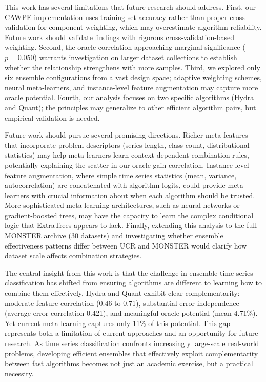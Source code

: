 \documentclass[pdflatex,sn-basic]{sn-jnl}           %
\theoremstyle{thmstyleone}%
\theoremstyle{thmstyletwo}%
\theoremstyle{thmstylethree}%
\begin{document}
This work has several limitations that future research should address. First, our CAWPE implementation uses training set accuracy rather than proper cross-validation for component weighting, which may overestimate algorithm reliability. Future work should validate findings with rigorous cross-validation-based weighting. Second, the oracle correlation approaching marginal significance ($p=0.050$) warrants investigation on larger dataset collections to establish whether the relationship strengthens with more samples. Third, we explored only six ensemble configurations from a vast design space; adaptive weighting schemes, neural meta-learners, and instance-level feature augmentation may capture more oracle potential. Fourth, our analysis focuses on two specific algorithms (Hydra and Quant); the principles may generalize to other efficient algorithm pairs, but empirical validation is needed.

Future work should pursue several promising directions. Richer meta-features that incorporate problem descriptors (series length, class count, distributional statistics) may help meta-learners learn context-dependent combination rules, potentially explaining the scatter in our oracle gain correlation. Instance-level feature augmentation, where simple time series statistics (mean, variance, autocorrelation) are concatenated with algorithm logits, could provide meta-learners with crucial information about when each algorithm should be trusted. More sophisticated meta-learning architectures, such as neural networks or gradient-boosted trees, may have the capacity to learn the complex conditional logic that ExtraTrees appears to lack. Finally, extending this analysis to the full MONSTER archive (30 datasets) and investigating whether ensemble effectiveness patterns differ between UCR and MONSTER would clarify how dataset scale affects combination strategies.

The central insight from this work is that the challenge in ensemble time series classification has shifted from ensuring algorithms are different to learning how to combine them effectively. Hydra and Quant exhibit clear complementarity: moderate feature correlation (0.46 to 0.71), substantial error independence (average error correlation 0.421), and meaningful oracle potential (mean 4.71\%). Yet current meta-learning captures only 11\% of this potential. This gap represents both a limitation of current approaches and an opportunity for future research. As time series classification confronts increasingly large-scale real-world problems, developing efficient ensembles that effectively exploit complementarity between fast algorithms becomes not just an academic exercise, but a practical necessity. 
\end{document}
